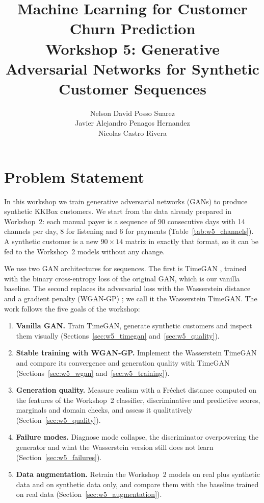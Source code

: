 \documentclass{article}
\title{Machine Learning for Customer Churn Prediction\\[0.3em]\large Workshop 5: Generative Adversarial Networks for Synthetic Customer Sequences}
\author{Nelson David Posso Suarez \\ Javier Alejandro Penagos Hernandez \\ Nicolas Castro Rivera }
\date{}
\begin{document}
\maketitle

\section{Problem Statement}

In this workshop we train generative adversarial networks (GANs) to produce synthetic KKBox customers. We start from the data already prepared in Workshop~2: each manual payer is a sequence of 90 consecutive days with 14 channels per day, 8 for listening and 6 for payments (Table~\ref{tab:w5_channels}). A synthetic customer is a new $90 \times 14$ matrix in exactly that format, so it can be fed to the Workshop~2 models without any change.

We use two GAN architectures for sequences. The first is TimeGAN \cite{yoon2019}, trained with the binary cross-entropy loss of the original GAN, which is our vanilla baseline. The second replaces its adversarial loss with the Wasserstein distance and a gradient penalty (WGAN-GP) \cite{gulrajani2017}; we call it the Wasserstein TimeGAN. The work follows the five goals of the workshop:
\begin{enumerate}
    \item \textbf{Vanilla GAN.} Train TimeGAN, generate synthetic customers and inspect them visually (Sections~\ref{sec:w5_timegan} and~\ref{sec:w5_quality}).
    \item \textbf{Stable training with WGAN-GP.} Implement the Wasserstein TimeGAN and compare its convergence and generation quality with TimeGAN (Sections~\ref{sec:w5_wgan} and~\ref{sec:w5_training}).
    \item \textbf{Generation quality.} Measure realism with a Fréchet distance computed on the features of the Workshop~2 classifier, discriminative and predictive scores, marginals and domain checks, and assess it qualitatively (Section~\ref{sec:w5_quality}).
    \item \textbf{Failure modes.} Diagnose mode collapse, the discriminator overpowering the generator and what the Wasserstein version still does not learn (Section~\ref{sec:w5_failures}).
    \item \textbf{Data augmentation.} Retrain the Workshop~2 models on real plus synthetic data and on synthetic data only, and compare them with the baseline trained on real data (Section~\ref{sec:w5_augmentation}).
\end{enumerate}
\end{document}
